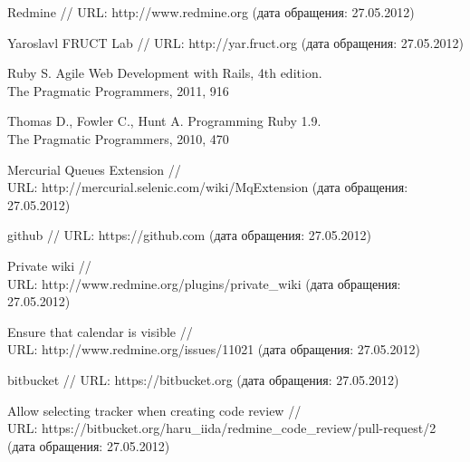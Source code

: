 \begin{thebibliography}{99}

Redmine  // URL:
http://www.redmine.org (дата обращения: 27.05.2012)

Yaroslavl FRUCT Lab  // URL:
http://yar.fruct.org (дата обращения: 27.05.2012)

Ruby S. Agile Web Development with Rails, 4th edition. \\ The Pragmatic
Programmers, 2011, 916

Thomas D., Fowler C., Hunt A. Programming Ruby 1.9. \\ The Pragmatic
Programmers, 2010, 470

Mercurial Queues Extension // \\ URL:
http://mercurial.selenic.com/wiki/MqExtension (дата обращения: 27.05.2012)

github // URL: https://github.com (дата обращения: 27.05.2012)

Private wiki // \\ URL:
http://www.redmine.org/plugins/private\_wiki (дата обращения: 27.05.2012)

Ensure that calendar is visible // \\ URL:
http://www.redmine.org/issues/11021 (дата обращения: 27.05.2012)

bitbucket // URL: 
https://bitbucket.org (дата обращения: 27.05.2012)

Allow selecting tracker when creating code review // \\ URL: 
https://bitbucket.org/haru\_iida/redmine\_code\_review/pull-request/2 \\
(дата обращения: 27.05.2012)

\end{thebibliography}
